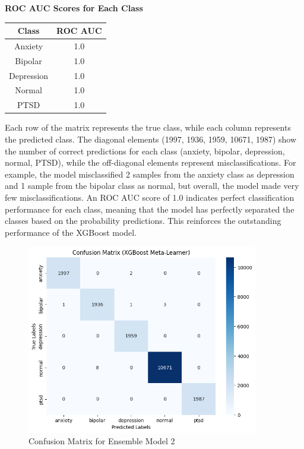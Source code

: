 \pagebreak
\begin{center}
    \textbf{ROC AUC Scores for Each Class} \\[0.5em]
    \begin{tabular}{|c|c|}
        \hline
        \textbf{Class} & \textbf{ROC AUC} \\ \hline
        Anxiety  & 1.0 \\ \hline
        Bipolar  & 1.0 \\ \hline
        Depression & 1.0 \\ \hline
        Normal   & 1.0 \\ \hline
        PTSD     & 1.0 \\ \hline
    \end{tabular}
\end{center}

\noindent
Each row of the matrix represents the true class, while each column represents the predicted class. The diagonal elements (1997, 1936, 1959, 10671, 1987) show the number of correct predictions for each class (anxiety, bipolar, depression, normal, PTSD), while the off-diagonal elements represent misclassifications. For example, the model misclassified 2 samples from the anxiety class as depression and 1 sample from the bipolar class as normal, but overall, the model made very few misclassifications. An ROC AUC score of 1.0 indicates perfect classification performance for each class, meaning that the model has perfectly separated the classes based on the probability predictions. This reinforces the outstanding performance of the XGBoost model.

\begin{figure}[h!]  
    \centering
    \includegraphics[width=0.9\textwidth]{Images/EM4 CM.png}  
    \caption{Confusion Matrix for Ensemble Model 2}
    \label{dfdl1244883}  %
\end{figure}

